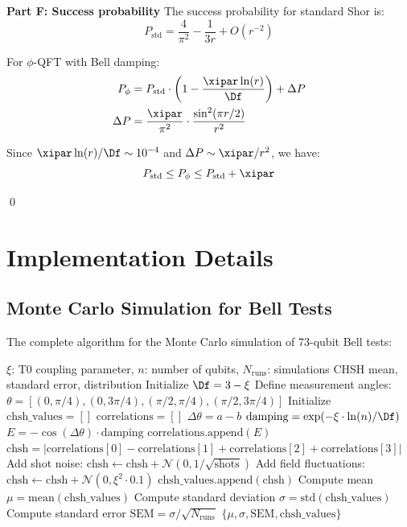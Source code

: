 \textbf{Part F: Success probability}
The success probability for standard Shor is:
\[
P_{\text{std}} = \frac{4}{\pi^2} - \frac{1}{3r} + O(r^{-2})
\]

For $\phi$-QFT with Bell damping:
\begin{align*}
	P_{\phi} &= P_{\text{std}} \cdot \left(1 - \frac{\xipar \ln(r)}{\Df}\right) + \Delta P \\
	\Delta P &= \frac{\xipar}{\pi^2} \cdot \frac{\sin^2(\pi r/2)}{r^2}
\end{align*}

Since $\xipar \ln(r)/\Df \sim 10^{-4}$ and $\Delta P \sim \xipar/r^2$, we have:
\[
P_{\text{std}} \leq P_{\phi} \leq P_{\text{std}} + \xipar
\]

\qed

\section{Implementation Details}
\label{app:implementation}

\subsection{Monte Carlo Simulation for Bell Tests}
\label{app:monte_carlo}

The complete algorithm for the Monte Carlo simulation of 73-qubit Bell tests:

\begin{algorithm}[H]
	\caption{Monte Carlo Bell Test Simulation (Corrected Version)}
	\begin{algorithmic}[1]
		\REQUIRE $\xi$: T0 coupling parameter, $n$: number of qubits, $N_{\text{runs}}$: simulations
		\ENSURE CHSH mean, standard error, distribution
		\STATE Initialize $\Df = 3 - \xi$
		\STATE Define measurement angles: $\theta = [(0, \pi/4), (0, 3\pi/4), (\pi/2, \pi/4), (\pi/2, 3\pi/4)]$
		\STATE Initialize $\text{chsh\_values} = []$
		\STATE $\text{correlations} = []$
		\STATE $\Delta\theta = a - b$
		\STATE $\text{damping} = \exp(-\xi \cdot \ln(n) / \Df)$
		\STATE $E = -\cos(\Delta\theta) \cdot \text{damping}$ 
		\STATE $\text{correlations.append}(E)$
		\ENDFOR
		\STATE $\text{chsh} = |\text{correlations}[0] - \text{correlations}[1] + \text{correlations}[2] + \text{correlations}[3]|$
		\STATE Add shot noise: $\text{chsh} \leftarrow \text{chsh} + \mathcal{N}(0, 1/\sqrt{\text{shots}})$
		\STATE Add field fluctuations: $\text{chsh} \leftarrow \text{chsh} + \mathcal{N}(0, \xi^2 \cdot 0.1)$
		\STATE $\text{chsh\_values.append}(\text{chsh})$
		\ENDFOR
		\STATE Compute mean $\mu = \text{mean}(\text{chsh\_values})$
		\STATE Compute standard deviation $\sigma = \text{std}(\text{chsh\_values})$
		\STATE Compute standard error $\text{SEM} = \sigma / \sqrt{N_{\text{runs}}}$
		\RETURN $\{\mu, \sigma, \text{SEM}, \text{chsh\_values}\}$
	\end{algorithmic}
\end{algorithm}


